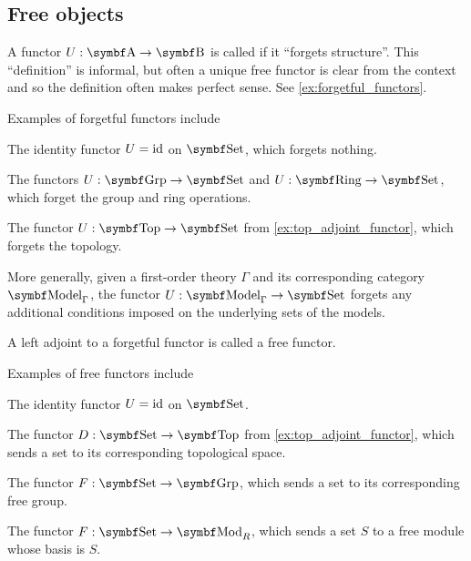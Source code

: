 \subsection{Free objects}\label{subsec:free_objects}

\begin{definition}\label{def:forgetful_functor}\cite[examples 1.2.3]{Leinster2014}
  A functor \( U: \Cat{A} \to \Cat{B} \) is called  if it \enquote{forgets structure}. This \enquote{definition} is informal, but often a unique free functor is clear from the context and so the definition often makes perfect sense. See \cref{ex:forgetful_functors}.
\end{definition}

\begin{example}\label{ex:forgetful_functors}
  Examples of forgetful functors include

  \begin{defenum}
    \item The identity functor \( U = \operatorname{id} \) on \( \Cat{Set} \), which forgets nothing.
    \item The functors \( U: \Cat{Grp} \to \Cat{Set} \) and \( U: \Cat{Ring} \to \Cat{Set} \), which forget the group and ring operations.
    \item The functor \( U: \Cat{Top} \to \Cat{Set} \) from \cref{ex:top_adjoint_functor}, which forgets the topology.
    \item More generally, given a first-order theory \( \Gamma \) and its corresponding category \( \Cat{Model}_\Gamma \), the functor \( U: \Cat{Model}_\Gamma \to \Cat{Set} \) forgets any additional conditions imposed on the underlying sets of the models.
  \end{defenum}
\end{example}

\begin{definition}\label{def:free_functor}\cite{nLab:free_object}
  A left adjoint to a forgetful functor is called a free functor.
\end{definition}

\begin{example}\label{ex:free_functors}
  Examples of free functors include

  \begin{defenum}
    \item The identity functor \( U = \operatorname{id} \) on \( \Cat{Set} \).
    \item The functor \( D: \Cat{Set} \to \Cat{Top} \) from \cref{ex:top_adjoint_functor}, which sends a set to its corresponding topological space.
    \item The functor \( F: \Cat{Set} \to \Cat{Grp} \), which sends a set to its corresponding free group.
    \item The functor \( F: \Cat{Set} \to \Cat{Mod}_R \), which sends a set \( S \) to a free module whose basis is \( S \).
  \end{defenum}
\end{example}

